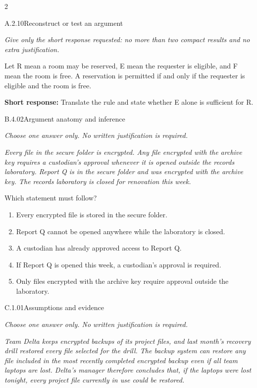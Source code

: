 \documentclass[9pt]{extarticle}
\newcommand{\choice}[1]{\item #1}
\begin{document}
\begin{multicols}{2}
\begin{DenseCoreProblem}{A.2.10}{Reconstruct or test an argument}
{\scriptsize\textit{Give only the short response requested: no more than two compact results and no extra justification.}\par}
Let R mean a room may be reserved, E mean the requester is eligible, and F mean the room is free. A reservation is permitted if and only if the requester is eligible and the room is free.

\textbf{Short response:} Translate the rule and state whether E alone is sufficient for R.
\end{DenseCoreProblem}
\begin{DenseCoreProblem}{B.4.02}{Argument anatomy and inference}
{\scriptsize\textit{Choose one answer only. No written justification is required.}\par}
\emph{Every file in the secure folder is encrypted. Any file encrypted with the archive key requires a custodian's approval whenever it is opened outside the records laboratory. Report Q is in the secure folder and was encrypted with the archive key. The records laboratory is closed for renovation this week.}

Which statement must follow?
\begin{enumerate}[label=(\alph*)]
  \choice{Every encrypted file is stored in the secure folder.}
  \choice{Report Q cannot be opened anywhere while the laboratory is closed.}
  \choice{A custodian has already approved access to Report Q.}
  \choice{If Report Q is opened this week, a custodian's approval is required.}
  \choice{Only files encrypted with the archive key require approval outside the laboratory.}
\end{enumerate}
\end{DenseCoreProblem}
\columnbreak
\begin{DenseCoreProblem}{C.1.01}{Assumptions and evidence}
{\scriptsize\textit{Choose one answer only. No written justification is required.}\par}
\emph{Team Delta keeps encrypted backups of its project files, and last month's recovery drill restored every file selected for the drill. The backup system can restore any file included in the most recently completed encrypted backup even if all team laptops are lost. Delta's manager therefore concludes that, if the laptops were lost tonight, every project file currently in use could be restored.}


\end{DenseCoreProblem}
\end{multicols}
\end{document}
